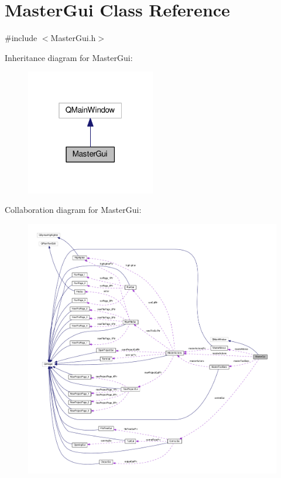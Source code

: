 \hypertarget{class_master_gui}{\section{Master\-Gui Class Reference}
\label{class_master_gui}
}


{\ttfamily \#include $<$Master\-Gui.\-h$>$}



Inheritance diagram for Master\-Gui\-:\nopagebreak
\begin{figure}[H]
\begin{center}
\leavevmode
\includegraphics[width=160pt]{class_master_gui__inherit__graph}
\end{center}
\end{figure}


Collaboration diagram for Master\-Gui\-:\nopagebreak
\begin{figure}[H]
\begin{center}
\leavevmode
\includegraphics[width=350pt]{class_master_gui__coll__graph}
\end{center}
\end{figure}
